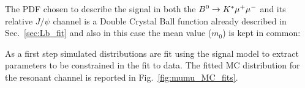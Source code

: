 The PDF chosen to describe the signal in both the ${{B}^0} \rightarrow{\ensuremath{{K}^*}}{\ensuremath{\mu^+\mu^-}}$ and its relative $J/\psi$ channel 
is a Double Crystal Ball function already described in Sec.~\ref{sec:Lb_fit} and also in this case
the mean value ($m_0$) is kept in common:







As a first step simulated distributions are fit using the signal model to extract parameters to be
constrained in the fit to data.
The fitted MC distribution for the resonant channel is reported in Fig.~\ref{fig:mumu_MC_fits}.

